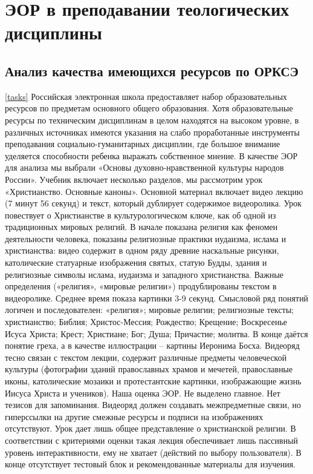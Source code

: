 \section{ЭОР в преподавании теологических дисциплины}

\subsection{Анализ качества имеющихся ресурсов по ОРКСЭ}
\ref{tasks}
Российская электронная школа предоставляет набор образовательных ресурсов по предметам основного общего образования. Хотя образовательные ресурсы по техническим дисциплинам в целом находятся на высоком уровне, в различных источниках имеются указания на слабо проработанные инструменты преподавания социально-гуманитарных дисциплин, где большое внимание уделяется способности ребенка выражать собственное мнение.\cite{13}
В качестве ЭОР для анализа мы выбрали «Основы духовно-нравственной культуры народов России». Учебник включает несколько разделов, мы рассмотрим урок «Христианство. Основные каноны»\cite{14}. Основной материал включает видео лекцию (7 минут 56 секунд) и текст, который дублирует содержимое видеоролика. Урок повествует о Христианстве в культурологическом ключе, как об одной из традиционных мировых религий.
В начале показана религия как феномен деятельности человека, показаны религиозные практики иудаизма, ислама и христианства: видео содержит в одном ряду древние наскальные рисунки, католические статуарные изображения святых, статую Будды, здания и религиозные символы ислама, иудаизма и западного христианства. Важные определения («религия», «мировые религии») продублированы текстом в видеоролике. Среднее время показа картинки 3-9 секунд.
Смысловой ряд понятий логичен и последователен: «религия»; мировые религии; религиозные тексты; христианство; Библия; Христос-Мессия; Рождество; Крещение; Воскресенье Исуса Христа; Крест; Христиане; Бог; Душа; Причастие; молитва. В конце даётся понятие греха, а в качестве иллюстрации – картины Иеронима Босха.
Видеоряд тесно связан с текстом лекции, содержит различные предметы человеческой культуры (фотографии зданий православных храмов и мечетей, православные иконы, католические мозаики и протестантские картинки, изображающие жизнь Иисуса Христа и учеников).
Наша оценка ЭОР. Не выделено главное. Нет тезисов для запоминания. Видеоряд должен создавать межпредметные связи, но гиперссылки на другие смежные ресурсы и подписи на изображениях отсутствуют. Урок дает лишь общее представление о христианской религии. В соответствии с критериями оценки такая лекция обеспечивает лишь пассивный уровень интерактивности, ему не хватает (действий по выбору пользователя). В конце отсутствует тестовый блок и рекомендованные материалы для изучения.
